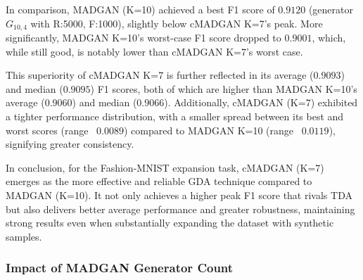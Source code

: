 In comparison, MADGAN (K=10) achieved a best F1 score of $0.9120$ (generator \(G_{10,4}\) with R:5000, F:1000), slightly below cMADGAN K=7's peak. More significantly, MADGAN K=10's worst-case F1 score dropped to $0.9001$, which, while still good, is notably lower than cMADGAN K=7's worst case.

This superiority of cMADGAN K=7 is further reflected in its average ($0.9093$) and median ($0.9095$) F1 scores, both of which are higher than MADGAN K=10's average ($0.9060$) and median ($0.9066$). Additionally, cMADGAN (K=7) exhibited a tighter performance distribution, with a smaller spread between its best and worst scores (range ~$0.0089$) compared to MADGAN K=10 (range ~$0.0119$), signifying greater consistency.

In conclusion, for the Fashion-MNIST expansion task, cMADGAN (K=7) emerges as the more effective and reliable GDA technique compared to MADGAN (K=10). It not only achieves a higher peak F1 score that rivals TDA but also delivers better average performance and greater robustness, maintaining strong results even when substantially expanding the dataset with synthetic samples.

\subsubsection[Question 5]{Impact of MADGAN Generator Count}            \label{exp_results_ans_q5}



\newpage

